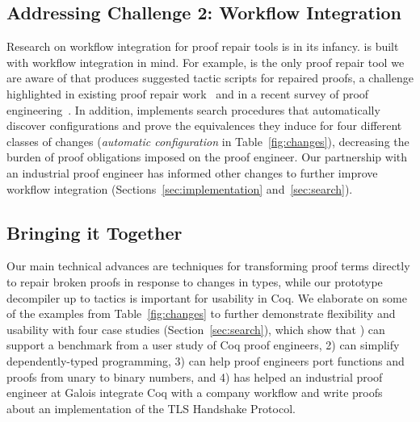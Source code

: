 \subsection*{Addressing Challenge 2: Workflow Integration}

Research on workflow integration for proof repair tools is in its infancy.
\toolname is built with workflow integration in mind.
For example, \toolname is the only proof repair tool we are aware of that produces suggested tactic scripts for repaired proofs,
a challenge highlighted in existing proof repair work~\cite{pumpkinpatch, robert2018} and in 
a recent survey of proof engineering~\cite{PGL-045}.
In addition, \toolname implements search procedures that 
automatically discover configurations and prove the equivalences they induce for four different classes of 
changes (\textit{automatic configuration} in Table~\ref{fig:changes}),
decreasing the burden of proof obligations imposed on the proof engineer.
Our partnership with an industrial proof engineer has informed other changes to further improve workflow integration
(Sections~\ref{sec:implementation} and~\ref{sec:search}).

\subsection*{Bringing it Together}

Our main technical advances are techniques for transforming proof terms directly to repair broken proofs in response to changes
in types, while our prototype decompiler up to tactics is important for usability in Coq.
We elaborate on some of the examples from Table~\ref{fig:changes} to further demonstrate flexibility and usability with four case studies (Section~\ref{sec:search}), which show that ) can support a benchmark from a user study of Coq proof engineers, 2) can simplify dependently-typed programming, %
3) can help proof engineers port functions and proofs from unary to binary numbers, and
4) has helped an industrial proof engineer at Galois integrate Coq with a company workflow and write proofs about an implementation of the TLS Handshake Protocol.

